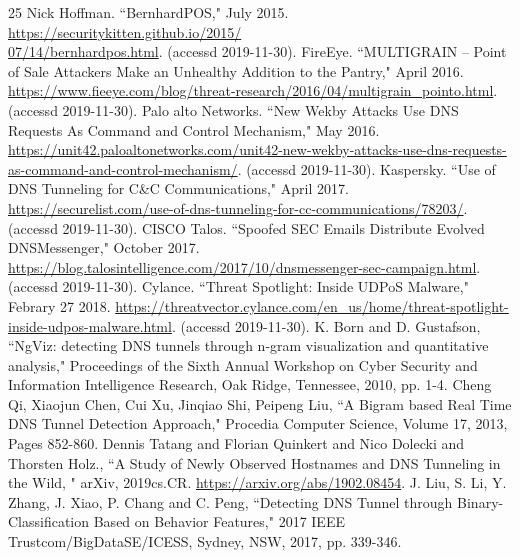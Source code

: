 \documentclass[12pt]{jarticle} %
\begin{document}
\begin{thebibliography} {25}
  Nick Hoffman. ``BernhardPOS," July 2015. \href{https://securitykitten.github.io/2015/07/14/bernhardpos.html}{https://securitykitten.github.io/2015/\\07/14/bernhardpos.html}. (accessd 2019-11-30).
  FireEye. ``MULTIGRAIN – Point of Sale Attackers Make an Unhealthy Addition to the Pantry," April 2016. \href{https://www.fieeye.com/blog/threat-research/2016/04/multigrain\_pointo.html}{https://www.fieeye.com/blog/threat-research/2016/04/multigrain\_pointo.html}. (accessd 2019-11-30).
  Palo alto Networks. ``New Wekby Attacks Use DNS Requests As Command and Control Mechanism," May 2016. \href{https://unit42.paloaltonetworks.com/unit42-new-wekby-attacks-use-dns-requests-as-command-and-control-mechanism/}{https://unit42.paloaltonetworks.com/unit42-new-wekby-attacks-use-dns-requests-as-command-and-control-mechanism/}. (accessd 2019-11-30).
  Kaspersky. ``Use of DNS Tunneling for C\&C Communications," April 2017. \href{https://securelist.com/use-of-dns-tunneling-for-cc-communications/78203/}{https://securelist.com/use-of-dns-tunneling-for-cc-communications/78203/}. (accessd 2019-11-30).
  CISCO Talos. ``Spoofed SEC Emails Distribute Evolved DNSMessenger," October 2017. \href{https://blog.talosintelligence.com/2017/10/dnsmessenger-sec-campaign.html}{https://blog.talosintelligence.com/2017/10/dnsmessenger-sec-campaign.html}. (accessd 2019-11-30).
  Cylance. ``Threat Spotlight: Inside UDPoS Malware," Febrary 27 2018. \href{https://threatvector.cylance.com/en\_us/home/threat-spotlight-inside-udpos-malware.html}{https://threatvector.cylance.com/en\_us/home/threat-spotlight-inside-udpos-malware.html}. (accessd 2019-11-30).
  K. Born and D. Gustafson, ``NgViz: detecting DNS tunnels through n-gram visualization and quantitative analysis," Proceedings of the Sixth Annual Workshop on Cyber Security and Information Intelligence Research, Oak Ridge, Tennessee, 2010, pp. 1-4.
  Cheng Qi, Xiaojun Chen, Cui Xu, Jinqiao Shi, Peipeng Liu, ``A Bigram based Real Time DNS Tunnel Detection Approach," Procedia Computer Science, Volume 17, 2013, Pages 852-860.
  Dennis Tatang and Florian Quinkert and Nico Dolecki and Thorsten Holz., ``A Study of Newly Observed Hostnames and DNS Tunneling in the Wild, " arXiv, 2019cs.CR. \href{https://arxiv.org/abs/1902.08454}{https://arxiv.org/abs/1902.08454}.
  J. Liu, S. Li, Y. Zhang, J. Xiao, P. Chang and C. Peng, ``Detecting DNS Tunnel through Binary-Classification Based on Behavior Features," 2017 IEEE Trustcom/BigDataSE/ICESS, Sydney, NSW, 2017, pp. 339-346.

\end{thebibliography}
\end{document}
